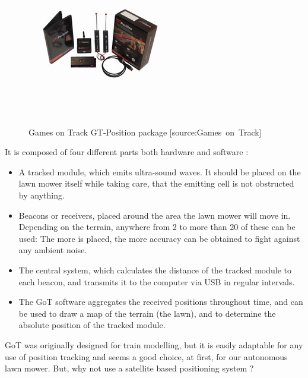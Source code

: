 \begin{figure}[H]
\centering
\includegraphics[scale=1.1]{figures/gotSystem.jpg} 
\label{fig:gotsystem}
\caption{Games on Track GT-Position package [source:Games\ on\ Track]} 
\end{figure}
\noindent

\noindent
It is composed of four different parts both hardware and software :
\begin{itemize}
	\item A tracked module, which emits ultra-sound waves. It should be placed on the lawn mower itself while taking care, that the emitting cell is not obstructed by anything.
	\item Beacons or receivers, placed around the area the lawn mower will move in. Depending on the terrain, anywhere from 2  to more than 20 of these can be used: The more is placed, the more accuracy can be obtained to fight against any ambient noise.
	\item The central system, which calculates the distance of the tracked module to each beacon, and transmits it to the computer via USB in regular intervals.
	\item The GoT software aggregates the received positions throughout time, and can be used to draw a map of the terrain (the lawn), and to determine the absolute position of the tracked module.
\end{itemize}

GoT was originally designed for train modelling, but it is easily adaptable for any use of position tracking and seems a good choice, at first, for our autonomous lawn mower.
But, why not use a satellite based positioning system ?

